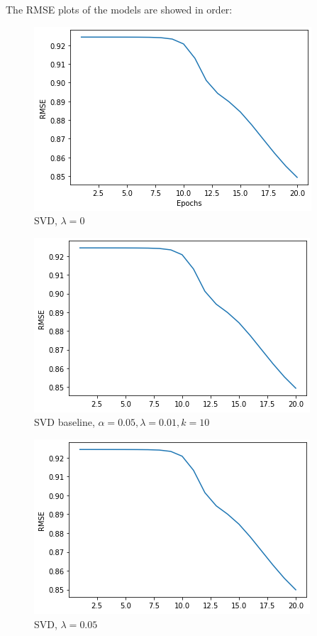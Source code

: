 \documentclass[final]{cvpr}
\begin{document}
The RMSE plots of the models are showed in order:

\begin{figure}[h]
	\includegraphics{screenshot20210504225232.png}
	\caption{SVD, $\lambda=0$}
\end{figure}

\begin{figure}[h]
	\includegraphics{screenshot20210504225440.png}
	\caption{SVD baseline, $\alpha=0.05, \lambda=0.01, k=10$}
\end{figure}

\begin{figure}[h]
	\includegraphics{screenshot20210504225504.png}
	\caption{SVD, $\lambda=0.05$}
\end{figure}
\end{document}

